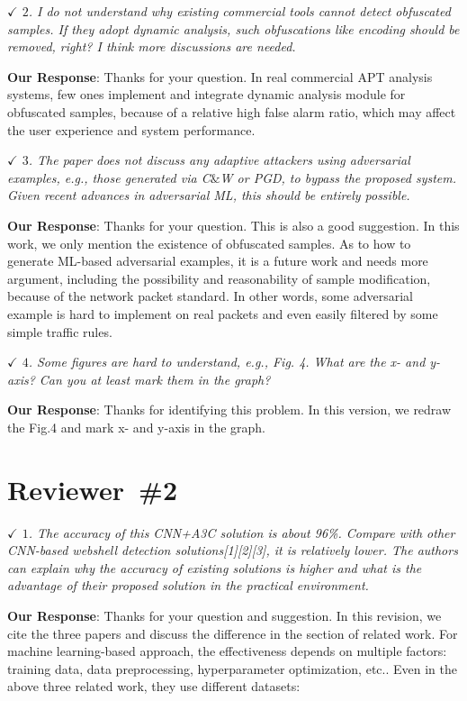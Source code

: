 \documentclass{amsart}
\theoremstyle{definition}
\theoremstyle{remark}
\numberwithin{equation}{section}
\begin{document}
\emph{$\checkmark$ $2$. I do not understand why existing commercial tools cannot detect obfuscated samples. If they adopt dynamic analysis, such obfuscations like encoding should be removed, right? I think more discussions are needed.}

\textbf{Our Response}:
Thanks for your question. In real commercial APT analysis systems, few ones implement and integrate dynamic analysis module for obfuscated samples, because of a relative high false alarm ratio, which may affect the user experience and system performance.

\emph{$\checkmark$ $3$. The paper does not discuss any adaptive attackers using adversarial examples, e.g., those generated via C$\&$W or PGD, to bypass the proposed system.  Given recent advances in adversarial ML, this should be entirely possible.}

\textbf{Our Response}:
Thanks for your question. This is also a good suggestion.
In this work, we only mention the existence of obfuscated samples. As to how to generate ML-based adversarial examples, it is a future work and needs more argument, including the possibility and reasonability of sample modification, because of the network packet standard. In other words, some adversarial example is hard to implement on real packets and even easily filtered by some simple traffic rules.
 

\emph{$\checkmark$ $4$. Some figures are hard to understand, e.g., Fig. 4.  What are the x- and y-axis?  Can you at least mark them in the graph?}

\textbf{Our Response}:
Thanks for identifying this problem. In this version, 
we redraw the Fig.4 and mark x- and y-axis in the graph. 



\section*{Reviewer~\#2}
\emph{$\checkmark$ $1$. The accuracy of this CNN+A3C solution is about 96\%. Compare with other CNN-based webshell detection solutions[1][2][3], it is relatively lower. The authors can explain why the accuracy of existing solutions is higher and what is the advantage of their proposed solution in the practical environment.}

\textbf{Our Response}:
Thanks for your question and suggestion.
In this revision, we cite the three papers and discuss the 
difference in the section of related work.
For machine learning-based approach, the effectiveness
depends on multiple factors: training data, data preprocessing, hyperparameter optimization, etc..
Even in the above three related work, they use different datasets: 
\end{document}
